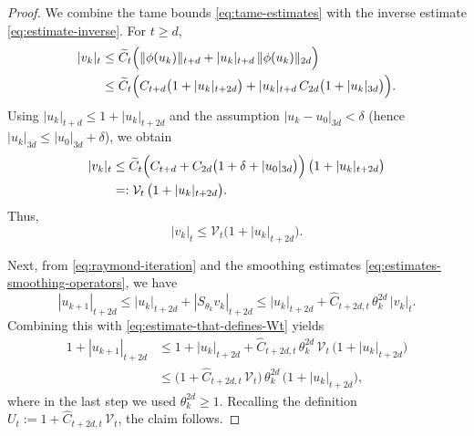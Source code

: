 \documentclass[11pt]{amsart}
\begin{document}
\begin{proof}
	We combine the tame bounds \eqref{eq:tame-estimates} with the inverse estimate
	\eqref{eq:estimate-inverse}.  For $t\ge d$,
	\begin{align*}
		|v_k|_t
		&\le \widetilde C_t\Bigl(\|\phi(u_k)\|_{t+d} + |u_k|_{t+d}\,\|\phi(u_k)\|_{2d}\Bigr) \\
		&\le \widetilde C_t\Bigl( C_{t+d}\bigl(1+|u_k|_{t+2d}\bigr)
		+ |u_k|_{t+d}\, C_{2d}\bigl(1+|u_k|_{3d}\bigr)\Bigr).
	\end{align*}
	Using $|u_k|_{t+d}\le 1+|u_k|_{t+2d}$ and the assumption $|u_k-u_0|_{3d}<\delta$ (hence
	$|u_k|_{3d}\le |u_0|_{3d}+\delta$), we obtain
	\begin{align*}
		|v_k|_t
		&\le \widetilde C_t\Bigl( C_{t+d}+ C_{2d}\bigl(1+\delta+|u_0|_{3d}\bigr)\Bigr)\,
		\bigl(1+|u_k|_{t+2d}\bigr) \\
		&=: \mathcal V_t\,\bigl(1+|u_k|_{t+2d}\bigr).
	\end{align*}
	Thus,
	\begin{equation}
		\label{eq:estimate-that-defines-Wt}
		|v_k|_t \le \mathcal V_t\bigl(1+|u_k|_{t+2d}\bigr).
	\end{equation}
	
	Next, from \eqref{eq:raymond-iteration} and the smoothing estimates
	\eqref{eq:estimates-smoothing-operators}, we have
	\[
	|u_{k+1}|_{t+2d}
	\le |u_k|_{t+2d} + |S_{\theta_k}v_k|_{t+2d}
	\le |u_k|_{t+2d} + \widehat C_{t+2d,t}\,\theta_k^{2d}\,|v_k|_t.
	\]
	Combining this with \eqref{eq:estimate-that-defines-Wt} yields
	\begin{align*}
		1+|u_{k+1}|_{t+2d}
		&\le 1+|u_k|_{t+2d}
		+ \widehat C_{t+2d,t}\,\theta_k^{2d}\,\mathcal V_t\,\bigl(1+|u_k|_{t+2d}\bigr) \\
		&\le \bigl(1+\widehat C_{t+2d,t}\,\mathcal V_t\bigr)\,\theta_k^{2d}\,\bigl(1+|u_k|_{t+2d}\bigr),
	\end{align*}
	where in the last step we used $\theta_k^{2d}\ge 1$.
	Recalling the definition $U_t := 1+\widehat C_{t+2d,t}\,\mathcal V_t$, the claim follows.
\end{proof}
\end{document}
